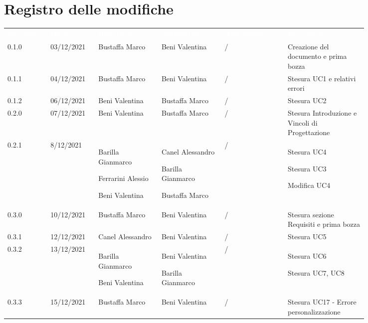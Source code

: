 \section*{Registro delle modifiche}

{\renewcommand{\arraystretch}{1.5}
\scriptsize
\begin{tabular}{p{0.10\linewidth}p{0.10\linewidth}p{0.15\linewidth}p{0.15\linewidth}p{0.15\linewidth}p{0.19\linewidth}}
	\rowcolor[RGB]{33, 73, 50}
	\textcolor{white}{\textbf{Versione}} & \textcolor{white}{\textbf{Data}} &
	\textcolor{white}{\textbf{Redattore}} & \textcolor{white}{\textbf{Verificatore}} &
	\textcolor{white}{\textbf{Approvatore}} & \textcolor{white}{\textbf{Descrizione}}\\
	\rowcolor[RGB]{216, 235, 171}
	0.1.0 & 03/12/2021 & Bustaffa Marco& Beni Valentina &/& Creazione del documento e prima bozza\\
	\rowcolor[RGB]{233, 245, 206}
	0.1.1 & 04/12/2021 & Bustaffa Marco& Beni Valentina &/& Stesura UC1 e relativi errori\\
	\rowcolor[RGB]{216, 235, 171}
	0.1.2 & 06/12/2021 & Beni Valentina& Bustaffa Marco &/& Stesura UC2\\
	\rowcolor[RGB]{233, 245, 206}
	0.2.0 & 07/12/2021 & Beni Valentina& Bustaffa Marco &/& Stesura Introduzione e Vincoli di Progettazione\\
	\rowcolor[RGB]{216, 235, 171}
	0.2.1 & 8/12/2021 & Barilla Gianmarco \par Ferrarini Alessio \par Beni Valentina& Canel Alessandro \par Barilla Gianmarco \par Bustaffa Marco&/& Stesura UC4 \par Stesura UC3 \par Modifica UC4 \\
	\rowcolor[RGB]{233, 245, 206}
	0.3.0 & 10/12/2021 & Bustaffa Marco& Beni Valentina &/& Stesura sezione Requisiti e prima bozza\\
	\rowcolor[RGB]{216, 235, 171}
	0.3.1 & 12/12/2021 & Canel Alessandro& Beni Valentina &/& Stesura UC5\\
	\rowcolor[RGB]{233, 245, 206}
	0.3.2 & 13/12/2021 & Barilla Gianmarco \par Beni Valentina& Beni Valentina \par Barilla Gianmarco &/& Stesura UC6 \par Stesura UC7, UC8\\
	\rowcolor[RGB]{216, 235, 171}
	0.3.3 & 15/12/2021 & Bustaffa Marco& Beni Valentina &/& Stesura UC17 - Errore personalizzazione\\

\end{tabular}}
